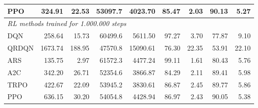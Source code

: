 \begin{samepage}
\begin{center}
\begin{tabular}{l|rr|rr|rr|rr}
    PPO          &   324.91 &    22.53 &    53097.7 &    4023.70 &   85.47 &    2.03 &   90.13 &    5.27 \\
    \midrule
    \multicolumn{9}{l}{\textit{RL methods trained for 1.000.000 steps}} \\
    \midrule
    DQN          &   258.64 &    15.73 &    60499.6 &    5611.50 &   97.27 &    3.70 &   77.87 &    9.10 \\
    QRDQN        &  1673.74 &   188.95 &    47570.8 &   15090.61 &   76.30 &   22.35 &   53.91 &   22.10 \\
    ARS          &   135.75 &     2.97 &    61572.3 &    4477.24 &   99.11 &    1.61 &   80.43 &    5.76 \\
    A2C          &   342.20 &    26.71 &    52354.6 &    3866.87 &   84.29 &    2.11 &   89.41 &    5.98 \\
    TRPO         &   422.67 &    22.09 &    53945.2 &    3830.61 &   86.87 &    2.45 &   89.77 &    5.86 \\
    PPO          &   636.15 &    30.20 &    54054.8 &    4428.94 &   86.97 &    2.43 &   90.05 &    5.38 \\
    \bottomrule
  \end{tabular}
\end{center}
\end{samepage}


